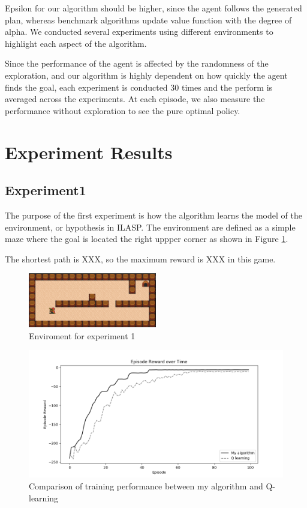 Epsilon for our algorithm should be higher, since the agent follows the generated plan, 
whereas benchmark algorithms update value function with the degree of alpha. 
We conducted several experiments using different environments to highlight each aspect of the algorithm.

Since the performance of the agent is affected by the randomness of the exploration, 
and our algorithm is highly dependent on how quickly the agent finds the goal, 
each experiment is conducted 30 times and the perform is averaged across the experiments.
At each episode, we also measure the performance without exploration to see the pure optimal policy.

\section{Experiment Results}
\label{learning_evaluation}

\subsection{Experiment1}
The purpose of the first experiment is how the algorithm learns the model of the environment, or hypothesis in ILASP.
The environment are defined as a simple maze where the goal is located the right uppper corner as shown in Figure \ref{experiment1}.

The shortest path is XXX, so the maximum reward is XXX in this game. 

\begin{figure}[!htb]
\centering
\includegraphics[width=0.5\textwidth]{./figures/experiment1}
\caption{Enviroment for experiment 1}
\label{experiment1}
\end{figure}

\begin{figure}[!htb]
\centering
\includegraphics[width=1.0\textwidth]{./figures/experiment1_training}
\caption{Comparison of training performance between my algorithm and Q-learning}
\label{experiment1_training}
\end{figure}

